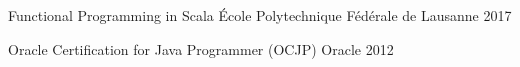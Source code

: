 



\begin{cvhonors}

  \cvhonor
    {Functional Programming in Scala} %
    {\hspace{0.5em}École Polytechnique Fédérale de Lausanne} %
    {} %
    {2017} %

  \cvhonor
    {Oracle Certification for Java Programmer (OCJP)} %
    {\hspace{0.5em}Oracle} %
    {} %
    {2012} %

\end{cvhonors}
